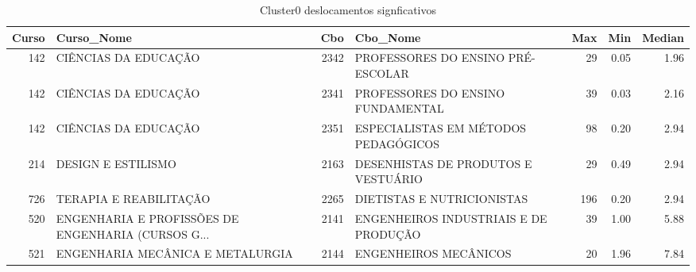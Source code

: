 \begin{table}
\centering
\caption{Cluster0 deslocamentos signficativos }
\label{tab:Salarios_Cluster0}
\begin{tabular}{rlrlrrr}
\toprule
 Curso &                                         Curso\_Nome &  Cbo &                              Cbo\_Nome &  Max &  Min &  Median \\
\midrule
   142 &                               CIÊNCIAS DA EDUCAÇÃO & 2342 &     PROFESSORES DO ENSINO PRÉ-ESCOLAR &   29 & 0.05 &    1.96 \\
   142 &                               CIÊNCIAS DA EDUCAÇÃO & 2341 &     PROFESSORES DO ENSINO FUNDAMENTAL &   39 & 0.03 &    2.16 \\
   142 &                               CIÊNCIAS DA EDUCAÇÃO & 2351 &  ESPECIALISTAS EM MÉTODOS PEDAGÓGICOS &   98 & 0.20 &    2.94 \\
   214 &                                 DESIGN E ESTILISMO & 2163 &  DESENHISTAS DE PRODUTOS E  VESTUÁRIO &   29 & 0.49 &    2.94 \\
   726 &                             TERAPIA E REABILITAÇÃO & 2265 &            DIETISTAS E NUTRICIONISTAS &  196 & 0.20 &    2.94 \\
   520 & ENGENHARIA E PROFISSÕES DE ENGENHARIA (CURSOS G... & 2141 & ENGENHEIROS INDUSTRIAIS E DE PRODUÇÃO &   39 & 1.00 &    5.88 \\
   521 &                   ENGENHARIA MECÂNICA E METALURGIA & 2144 &                 ENGENHEIROS MECÂNICOS &   20 & 1.96 &    7.84 \\
\bottomrule
\end{tabular}
\end{table}
